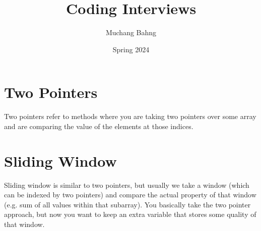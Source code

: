 \documentclass{article}
\begin{document}
\title{Coding Interviews}
\author{Muchang Bahng}
\date{Spring 2024}

\maketitle
\tableofcontents
\pagebreak

\section{Two Pointers}

  Two pointers refer to methods where you are taking two pointers over some array and are comparing the value of the elements at those indices.  

\section{Sliding Window}
  
  Sliding window is similar to two pointers, but usually we take a window (which can be indexed by two pointers) and compare the actual property of that window (e.g. sum of all values within that subarray). You basically take the two pointer approach, but now you want to keep an extra variable that stores some quality of that window. 
\end{document}
